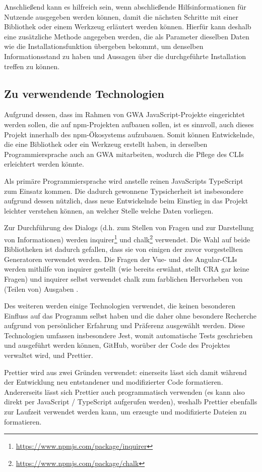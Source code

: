 Anschließend kann es hilfreich sein, wenn abschließende Hilfsinformationen für Nutzende ausgegeben werden können, damit die nächsten Schritte mit einer Bibliothek oder einem Werkzeug erläutert werden können. Hierfür kann deshalb eine zusätzliche Methode angegeben werden, die als Parameter dieselben Daten wie die Installationsfunktion übergeben bekommt, um denselben Informationsstand zu haben und Aussagen über die durchgeführte Installation treffen zu können.

\subsection{Zu verwendende Technologien}
Aufgrund dessen, dass im Rahmen von \gls{GWA} JavaScript-Projekte eingerichtet werden sollen, die auf \gls{npm}-Projekten aufbauen sollen, ist es sinnvoll, auch dieses Projekt innerhalb des \gls{npm}-Ökosystems aufzubauen. Somit können Entwickelnde, die eine Bibliothek oder ein Werkzeug erstellt haben, in derselben Programmiersprache auch an \gls{GWA} mitarbeiten, wodurch die Pflege des \gls{CLI}s erleichtert werden könnte.

Als primäre Programmiersprache wird anstelle reinen JavaScripts TypeScript zum Einsatz kommen. Die dadurch gewonnene Typsicherheit ist insbesondere aufgrund dessen nützlich, dass neue Entwickelnde beim Einstieg in das Projekt leichter verstehen können, an welcher Stelle welche Daten vorliegen.

Zur Durchführung des Dialogs (d.h. zum Stellen von Fragen und zur Darstellung von Informationen) werden inquirer\footnote{\url{https://www.npmjs.com/package/inquirer}} und chalk\footnote{\url{https://www.npmjs.com/package/chalk}} verwendet. Die Wahl auf beide Bibliotheken ist dadurch gefallen, dass sie von einigen der zuvor vorgestellten Generatoren verwendet werden. Die Fragen der Vue- und des Angular-\gls{CLI}s werden mithilfe von inquirer gestellt \cite{vue_cli_uses_inquirer} \cite{angular_cli_uses_inquirer} (wie bereits erwähnt, stellt \gls{CRA} gar keine Fragen) und inquirer selbst verwendet chalk zum farblichen Hervorheben von (Teilen von) Ausgaben \cite{inquirer_uses_chalk}.

Des weiteren werden einige Technologien verwendet, die keinen besonderen Einfluss auf das Programm selbst haben und die daher ohne besondere Recherche aufgrund von persönlicher Erfahrung und Präferenz ausgewählt werden. Diese Technologien umfassen insbesondere Jest, womit automatische Tests geschrieben und ausgeführt werden können, GitHub, worüber der Code des Projektes verwaltet wird, und Prettier.

Prettier wird aus zwei Gründen verwendet: einerseits lässt sich damit während der Entwicklung neu entstandener und modifizierter Code formatieren. Andererseits lässt sich Prettier auch programmatisch verwenden (es kann also direkt per JavaScript / TypeScript aufgerufen werden), weshalb Prettier ebenfalls zur Laufzeit verwendet werden kann, um erzeugte und modifizierte Dateien zu formatieren.
